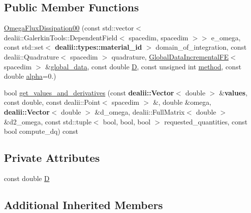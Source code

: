 \subsection*{Public Member Functions}
\begin{DoxyCompactItemize}
\item 
\hyperlink{classincremental_f_e_1_1_omega_flux_dissipation00_a37c7be7431a199da9fb1351fcdbe2c3f}{Omega\+Flux\+Dissipation00} (const std\+::vector$<$ dealii\+::\+Galerkin\+Tools\+::\+Dependent\+Field$<$ spacedim, spacedim $>$$>$ e\+\_\+omega, const std\+::set$<$ {\bf dealii\+::types\+::material\+\_\+id} $>$ domain\+\_\+of\+\_\+integration, const dealii\+::\+Quadrature$<$ spacedim $>$ quadrature, \hyperlink{classincremental_f_e_1_1_global_data_incremental_f_e}{Global\+Data\+Incremental\+FE}$<$ spacedim $>$ \&\hyperlink{classincremental_f_e_1_1_omega_3_01spacedim_00_01spacedim_01_4_afffe781a5a2032ec003032adc78e1bf3}{global\+\_\+data}, const double \hyperlink{classincremental_f_e_1_1_omega_flux_dissipation00_ac0bf17df1157750f539c2cb1a2aabcd4}{D}, const unsigned int \hyperlink{classincremental_f_e_1_1_omega_3_01spacedim_00_01spacedim_01_4_a6c95d57122261e8a2e26d3818251bc9b}{method}, const double \hyperlink{classincremental_f_e_1_1_omega_3_01spacedim_00_01spacedim_01_4_ad881c36804cc027c301f4f069756c2db}{alpha}=0.)
\item 
bool \hyperlink{classincremental_f_e_1_1_omega_flux_dissipation00_a7b9ccca9346b229a5e7f4f2254d932ec}{get\+\_\+values\+\_\+and\+\_\+derivatives} (const {\bf dealii\+::\+Vector}$<$ double $>$ \&{\bf values}, const double, const dealii\+::\+Point$<$ spacedim $>$ \&, double \&omega, {\bf dealii\+::\+Vector}$<$ double $>$ \&d\+\_\+omega, dealii\+::\+Full\+Matrix$<$ double $>$ \&d2\+\_\+omega, const std\+::tuple$<$ bool, bool, bool $>$ requested\+\_\+quantities, const bool compute\+\_\+dq) const 
\end{DoxyCompactItemize}
\subsection*{Private Attributes}
\begin{DoxyCompactItemize}
\item 
const double \hyperlink{classincremental_f_e_1_1_omega_flux_dissipation00_ac0bf17df1157750f539c2cb1a2aabcd4}{D}
\end{DoxyCompactItemize}
\subsection*{Additional Inherited Members}


